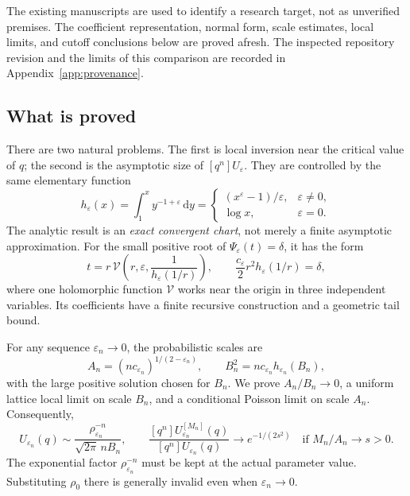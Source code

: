 \documentclass[11pt,a4paper]{article}
\numberwithin{equation}{section}
\theoremstyle{definition}
\theoremstyle{remark}
\newcommand{\eps}{\varepsilon}
\newcommand{\dd}{\,\mathrm d}
\newcommand{\cV}{\mathcal V}
\begin{document}
The existing manuscripts are used to identify a research target, not as
unverified premises. The coefficient representation, normal form, scale
estimates, local limits, and cutoff conclusions below are proved afresh.
The inspected repository revision and the limits of this comparison are
recorded in Appendix~\ref{app:provenance}.

\subsection{What is proved}
There are two natural problems. The first is local inversion near the critical
value of \(q\); the second is the asymptotic size of \([q^n]U_\eps\). They are
controlled by the same elementary function
\begin{equation}
 h_\eps(x)=\int_1^x y^{-1+\eps}\dd y
 =\begin{cases}(x^\eps-1)/\eps,&\eps\ne0,\\ \log x,&\eps=0.
 \end{cases}
 \label{eq:h-intro}
\end{equation}
The analytic result is an \emph{exact convergent chart}, not merely a finite
asymptotic approximation. For the small positive root of
\(\Psi_\eps(t)=\delta\), it has the form
\begin{equation}
 t=r\,\cV\left(r,\eps,\frac1{h_\eps(1/r)}\right),
 \qquad \frac{c_\eps}{2}r^2h_\eps(1/r)=\delta,
 \label{eq:chart-intro}
\end{equation}
where one holomorphic function \(\cV\) works near the origin in three
independent variables. Its coefficients have a finite recursive construction
and a geometric tail bound.

For any sequence \(\eps_n\to0\), the probabilistic scales are
\begin{equation}
 A_n=(nc_{\eps_n})^{1/(2-\eps_n)},
 \qquad B_n^2=nc_{\eps_n}h_{\eps_n}(B_n),
 \label{eq:scales-intro}
\end{equation}
with the large positive solution chosen for \(B_n\). We prove
\(A_n/B_n\to0\), a uniform lattice local limit on scale \(B_n\), and a
conditional Poisson limit on scale \(A_n\). Consequently,
\begin{equation}
 [q^n]U_{\eps_n}(q)\sim
 \frac{\rho_{\eps_n}^{-n}}{\sqrt{2\pi}\,nB_n},
 \qquad
 \frac{[q^n]U_{\eps_n}^{[M_n]}(q)}{[q^n]U_{\eps_n}(q)}
 \longrightarrow e^{-1/(2s^2)}
 \quad\text{if }M_n/A_n\to s>0.
 \label{eq:main-intro}
\end{equation}
The exponential factor \(\rho_{\eps_n}^{-n}\) must be kept at the actual
parameter value. Substituting \(\rho_0\) there is generally invalid even when
\(\eps_n\to0\).
\end{document}
